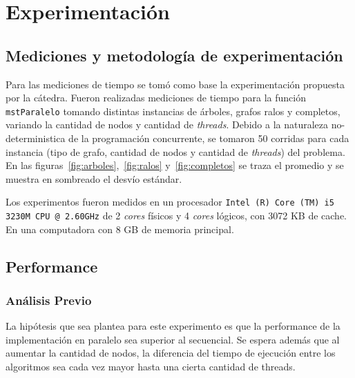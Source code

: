 \section{Experimentación}
\subsection{Mediciones y metodología de experimentación}

Para las mediciones de tiempo se tomó como base la experimentación propuesta
por la cátedra.
Fueron realizadas mediciones de tiempo para la función \texttt{mstParalelo}
tomando distintas instancias de árboles, grafos ralos y completos, variando la
cantidad de nodos y cantidad de \textit{threads}.
Debido a la naturaleza no-deterministica de la programación concurrente, se
tomaron 50 corridas para cada instancia (tipo de grafo, cantidad de nodos y
cantidad de \textit{threads}) del problema. En las
figuras~\ref{fig:arboles},~\ref{fig:ralos} y~\ref{fig:completos} se traza el
promedio y se muestra en sombreado el desvío estándar.

Los experimentos fueron medidos en un procesador \texttt{Intel (R) Core (TM) i5
3230M CPU @ 2.60GHz} de 2 \textit{cores} físicos y 4 \textit{cores} lógicos,
con 3072 KB de cache. En una computadora con 8 GB de memoria principal.

\subsection{Performance}

\subsubsection{Análisis Previo}
La hipótesis que sea plantea para este experimento es que la performance de la implementación en paralelo sea superior al secuencial. Se espera además que al aumentar la cantidad de nodos, la diferencia del tiempo de ejecución entre los algoritmos sea cada vez mayor hasta una cierta cantidad de threads.

